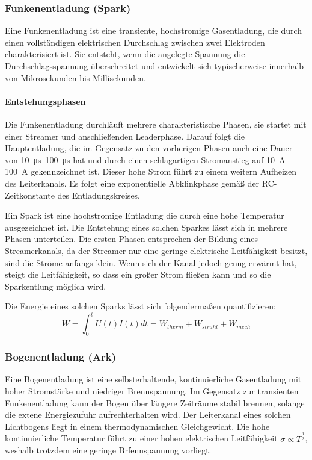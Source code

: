 \subsubsection{Funkenentladung (Spark)}
Eine Funkenentladung ist eine transiente, hochstromige Gasentladung, die durch einen vollständigen elektrischen Durchschlag zwischen zwei Elektroden charakterisiert ist. Sie entsteht, wenn die angelegte Spannung die Durchschlagsspannung überschreitet und entwickelt sich typischerweise innerhalb von Mikrosekunden bis Millisekunden. \newline

\paragraph{Entstehungsphasen}\newline
Die Funkenentladung durchläuft mehrere charakteristische Phasen, sie startet mit einer Streamer und anschließenden Leaderphase. Darauf folgt die Hauptentladung, die im Gegensatz zu den vorherigen Phasen auch eine Dauer von \SIrange{10}{100}{\micro\second} hat und durch einen schlagartigen Stromanstieg auf \SIrange{10}{100}{\ampere} gekennzeichnet ist. Dieser hohe Strom führt zu einem weitern Aufheizen des Leiterkanals. Es folgt eine exponentielle Abklinkphase gemäß der RC-Zeitkonstante des Entladungskreises.

Ein Spark ist eine hochstromige Entladung die durch eine hohe Temperatur ausgezeichnet ist. Die Entstehung eines solchen Sparkes lässt sich in mehrere Phasen unterteilen. Die ersten Phasen entsprechen der Bildung eines Streamerkanals, da der Streamer nur eine geringe elektrische Leitfähigkeit besitzt, sind die Ströme anfangs klein. Wenn sich der Kanal jedoch genug erwärmt hat, steigt die Leitfähigkeit, so dass ein großer Strom fließen kann und so die Sparkentlung möglich wird.

Die Energie eines solchen Sparks lässt sich folgendermaßen quantifizieren:
\begin{equation}
    W = \int_{0}^{t} U(t)I(t)dt = W_{therm} + W_{strahl} + W_{mech}
\end{equation}

\subsubsection{Bogenentladung (Ark)}
Eine Bogenentladung ist eine selbsterhaltende, kontinuierliche Gasentladung mit hoher Stromstärke und niedriger Brennspannung. Im Gegensatz zur transienten Funkenentladung kann der Bogen über längere Zeiträume stabil brennen, solange die extene Energiezufuhr aufrechterhalten wird. Der Leiterkanal eines solchen Lichtbogens liegt in einem thermodynamischen Gleichgewicht. Die hohe kontinuierliche Temperatur führt zu einer hohen elektrischen Leitfähigkeit \(\sigma \propto T^{\frac{3}{2}}\), weshalb trotzdem eine geringe Brfennspannung vorliegt. 

